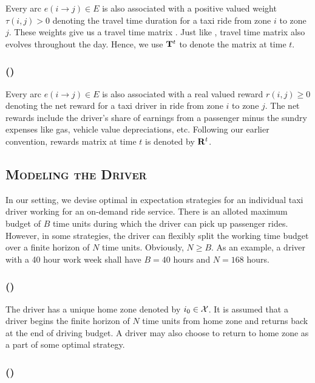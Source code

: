 Every arc $e(i\rightarrow j) \in E$ is also associated with a positive valued weight $\tau(i,j) > 0$ 
denoting the travel time duration for a taxi ride from zone $i$ to zone $j$. 
These weights give us a travel time matrix {\traveltimematrix}. 
Just like {\empiricaltransitionmatrix},  travel time matrix also evolves throughout the day. 
Hence, we use ${\mathbf{T}}^t$ to denote the matrix at time $t$.

\subsubsection{ (\rewardsmatrix)}

Every arc $e(i \rightarrow j) \in E$ is also associated with a real valued reward $r(i,j) \geq 0$ denoting
the net reward for a taxi driver in ride from zone $i$ to zone $j$. The net rewards include the driver's
share of earnings from a passenger minus the sundry expenses like gas, vehicle value depreciations, etc.
Following our earlier convention, rewards matrix at time $t$ is denoted by ${\mathbf{R}}^t$.

\subsection{\textsc{Modeling the Driver}}

In our setting, we devise optimal in expectation strategies for an individual taxi driver working for an
on-demand ride service. There is an alloted maximum budget of $B$ time units during which the driver can pick
up passenger rides. However, in some strategies, the driver can flexibly split the working time budget 
over a finite horizon of $N$ time units. Obviously, $N \geq B$. As an example, a driver with a 40 hour work week
shall have $B=40$ hours and $N=168$ hours.

\subsubsection{ (\homezone)}

The driver has a unique home zone denoted by $i_0 \in \mathcal{X}$. It is assumed that a driver begins the finite horizon of $N$
time units from home zone and returns back at the end of driving budget. A driver may also choose to return to 
home zone as a part of some optimal strategy.

\subsubsection{ (\actionsset)}

